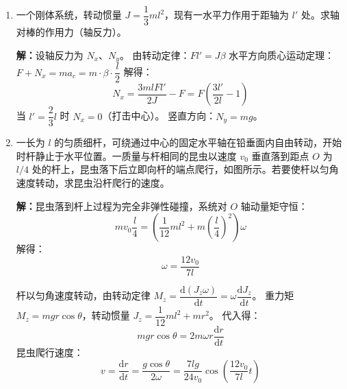 \documentclass{ctexart}
\begin{document}
\begin{enumerate}
第一阶段（杆由水平下落至铅直）：机械能守恒
\[
Mg\frac{L}{2} = \frac12 J\omega^{2},\quad J = \frac13 ML^{2}
\]
\[
\omega = \sqrt{\frac{3g}{L}}
\]

第二阶段（杆与 $A$ 完全非弹性碰撞）：系统对 $O$ 轴动量矩守恒
\[
J\omega = J\omega' + mL^{2}\omega'
\]
\[
\omega' = \frac{M\sqrt{3g/L}}{M + 3m}
\]

第三阶段（$A$ 滑动至静止）：动能定理
\[
\frac12 m(L\omega')^{2} = \mu mg s
\]
\[
s = \frac{L\omega'^{2}}{2\mu g} = \frac{3LM^{2}}{2\mu(M+3m)^{2}}
\]

\item 一个刚体系统，转动惯量 $J = \dfrac13 ml^{2}$，现有一水平力作用于距轴为 $l'$ 处。求轴对棒的作用力（轴反力）。

\textbf{解：}设轴反力为 $N_x$、$N_y$。
由转动定律：$Fl' = J\beta$
水平方向质心运动定理：$F + N_x = ma_c = m\cdot\beta\cdot\dfrac{l}{2}$
解得：
\[
N_x = \frac{3mlFl'}{2J} - F = F\left(\frac{3l'}{2l} - 1\right)
\]
当 $l' = \dfrac{2}{3}l$ 时 $N_x = 0$（打击中心）。
竖直方向：$N_y = mg$。

\item 一长为 $l$ 的匀质细杆，可绕通过中心的固定水平轴在铅垂面内自由转动，开始时杆静止于水平位置。一质量与杆相同的昆虫以速度 $v_0$ 垂直落到距点 $O$ 为 $l/4$ 处的杆上，昆虫落下后立即向杆的端点爬行，如图所示。若要使杆以匀角速度转动，求昆虫沿杆爬行的速度。

\textbf{解：}昆虫落到杆上过程为完全非弹性碰撞，系统对 $O$ 轴动量矩守恒：
\[
mv_0\frac{l}{4} = \left(\frac{1}{12}ml^{2} + m\left(\frac{l}{4}\right)^{2}\right)\omega
\]
解得：
\[
\omega = \frac{12v_0}{7l}
\]

杆以匀角速度转动，由转动定律 $M_z = \dfrac{\mathrm{d}(J_z\omega)}{\mathrm{d}t} = \omega\dfrac{\mathrm{d}J_z}{\mathrm{d}t}$。
重力矩 $M_z = mgr\cos\theta$，转动惯量 $J_z = \dfrac{1}{12}ml^{2} + mr^{2}$。
代入得：
\[
mgr\cos\theta = 2m\omega r\frac{\mathrm{d}r}{\mathrm{d}t}
\]
昆虫爬行速度：
\[
v = \frac{\mathrm{d}r}{\mathrm{d}t} = \frac{g\cos\theta}{2\omega}
= \frac{7lg}{24v_0}\cos\left(\frac{12v_0}{7l}t\right)
\]

\end{enumerate}
\end{document}
